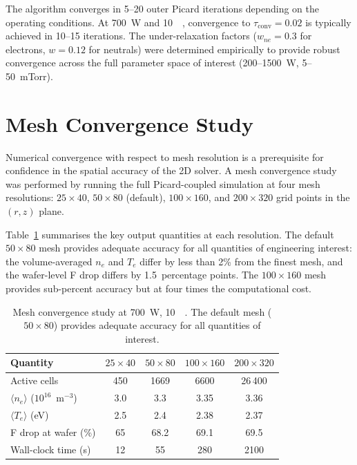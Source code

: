 \documentclass[11pt,a4paper]{report}
\begin{document}
The algorithm converges in 5--20 outer Picard iterations depending on the operating conditions.  At \SI{700}{\watt} and \SI{10}{\milli\torr}, convergence to $\tau_\mathrm{conv} = 0.02$ is typically achieved in 10--15 iterations.  The under-relaxation factors ($w_{ne} = 0.3$ for electrons, $w = 0.12$ for neutrals) were determined empirically to provide robust convergence across the full parameter space of interest (200--1500~W, 5--50~mTorr).


\section{Mesh Convergence Study}
\label{sec:mesh-convergence}

Numerical convergence with respect to mesh resolution is a prerequisite for confidence in the spatial accuracy of the 2D solver.  A mesh convergence study was performed by running the full Picard-coupled simulation at four mesh resolutions: $25 \times 40$, $50 \times 80$ (default), $100 \times 160$, and $200 \times 320$ grid points in the $(r, z)$ plane.

Table~\ref{tab:mesh-convergence} summarises the key output quantities at each resolution.  The default $50 \times 80$ mesh provides adequate accuracy for all quantities of engineering interest: the volume-averaged $n_e$ and $T_e$ differ by less than 2\% from the finest mesh, and the wafer-level F drop differs by 1.5~percentage points.  The $100 \times 160$ mesh provides sub-percent accuracy but at four times the computational cost.

\begin{table}[H]
\centering
\caption{Mesh convergence study at \SI{700}{\watt}, \SI{10}{\milli\torr}.  The default mesh ($50 \times 80$) provides adequate accuracy for all quantities of interest.}
\label{tab:mesh-convergence}
\begin{tabular}{@{}lcccc@{}}
\toprule
\textbf{Quantity} & $25 \times 40$ & $50 \times 80$ & $100 \times 160$ & $200 \times 320$ \\
\midrule
Active cells                          & 450    & 1669   & 6600   & 26\,400 \\
$\langle n_e \rangle$ ($10^{16}$~m$^{-3}$)  & 3.0    & 3.3    & 3.35   & 3.36 \\
$\langle T_e \rangle$ (eV)                  & 2.5    & 2.4    & 2.38   & 2.37 \\
F drop at wafer (\%)                  & 65     & 68.2   & 69.1   & 69.5 \\
Wall-clock time (s)                   & 12     & 55     & 280    & 2100 \\
\bottomrule
\end{tabular}
\end{table}
\end{document}
